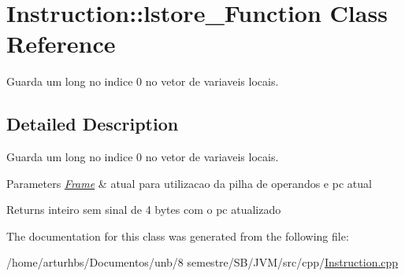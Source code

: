 \hypertarget{classInstruction_1_1lstore__0Function}{}\section{Instruction\+:\+:lstore\+\_\+Function Class Reference}
\label{classInstruction_1_1lstore__0Function}


Guarda um long no indice 0 no vetor de variaveis locais.  




\subsection{Detailed Description}
Guarda um long no indice 0 no vetor de variaveis locais. 


\begin{DoxyParams}{Parameters}
{\em \hyperlink{classFrame}{Frame}} & atual para utilizacao da pilha de operandos e pc atual \\
\hline
\end{DoxyParams}
\begin{DoxyReturn}{Returns}
inteiro sem sinal de 4 bytes com o pc atualizado 
\end{DoxyReturn}


The documentation for this class was generated from the following file\+:\begin{DoxyCompactItemize}
\item 
/home/arturhbs/\+Documentos/unb/8 semestre/\+S\+B/\+J\+V\+M/src/cpp/\hyperlink{Instruction_8cpp}{Instruction.\+cpp}\end{DoxyCompactItemize}
